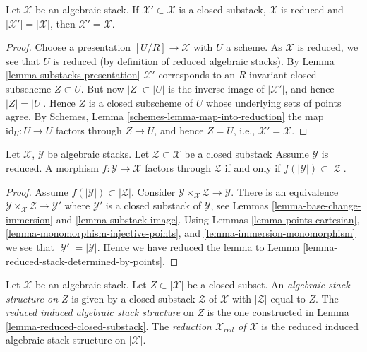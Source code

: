 \begin{lemma}
\label{lemma-reduced-stack-determined-by-points}
Let $\mathcal{X}$ be an algebraic stack.
If $\mathcal{X}' \subset \mathcal{X}$
is a closed substack, $\mathcal{X}$ is reduced and
$|\mathcal{X}'| = |\mathcal{X}|$, then $\mathcal{X}' = \mathcal{X}$.
\end{lemma}

\begin{proof}
Choose a presentation $[U/R] \to \mathcal{X}$ with $U$ a scheme.
As $\mathcal{X}$ is reduced, we see that $U$ is reduced (by definition
of reduced algebraic stacks). By
Lemma \ref{lemma-substacks-presentation}
$\mathcal{X}'$ corresponds to an $R$-invariant closed subscheme $Z \subset U$.
But now $|Z| \subset |U|$ is the inverse image of $|\mathcal{X}'|$, and
hence $|Z| = |U|$. Hence $Z$ is a closed subscheme of $U$ whose underlying
sets of points agree. By
Schemes, Lemma \ref{schemes-lemma-map-into-reduction}
the map $\text{id}_U : U \to U$ factors through $Z \to U$, and hence
$Z = U$, i.e., $\mathcal{X}' = \mathcal{X}$.
\end{proof}

\begin{lemma}
\label{lemma-map-into-reduction}
Let $\mathcal{X}$, $\mathcal{Y}$ be algebraic stacks.
Let $\mathcal{Z} \subset \mathcal{X}$ be a closed substack
Assume $\mathcal{Y}$ is reduced.
A morphism $f : \mathcal{Y} \to \mathcal{X}$ factors through
$\mathcal{Z}$ if and only if
$f(|\mathcal{Y}|) \subset |\mathcal{Z}|$.
\end{lemma}

\begin{proof}
Assume $f(|\mathcal{Y}|) \subset |\mathcal{Z}|$. Consider
$\mathcal{Y} \times_\mathcal{X} \mathcal{Z} \to \mathcal{Y}$.
There is an equivalence
$\mathcal{Y} \times_\mathcal{X} \mathcal{Z} \to \mathcal{Y}'$
where $\mathcal{Y}'$ is a closed substack of $\mathcal{Y}$, see
Lemmas \ref{lemma-base-change-immersion} and
\ref{lemma-substack-image}.
Using
Lemmas \ref{lemma-points-cartesian},
\ref{lemma-monomorphism-injective-points}, and
\ref{lemma-immersion-monomorphism}
we see that $|\mathcal{Y}'| = |\mathcal{Y}|$. Hence we have
reduced the lemma to
Lemma \ref{lemma-reduced-stack-determined-by-points}.
\end{proof}

\begin{definition}
\label{definition-reduced-induced-stack}
Let $\mathcal{X}$ be an algebraic stack.
Let $Z \subset |\mathcal{X}|$ be a closed subset.
An {\it algebraic stack structure on $Z$} is given by a closed substack
$\mathcal{Z}$ of $\mathcal{X}$ with $|\mathcal{Z}|$ equal to $Z$.
The {\it reduced induced algebraic stack structure}
on $Z$ is the one constructed in
Lemma \ref{lemma-reduced-closed-substack}.
The {\it reduction $\mathcal{X}_{red}$ of $\mathcal{X}$}
is the reduced induced algebraic stack structure on $|\mathcal{X}|$.
\end{definition}

